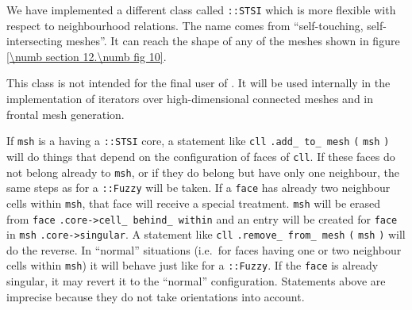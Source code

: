 We have implemented a different class called {\small\tt{}::STSI} which is more
flexible with respect to neighbourhood relations.
The name comes from ``self-touching, self-intersecting meshes''.
It can reach the shape of any of the meshes shown in figure \ref{\numb section 12.\numb fig 10}.

This class is not intended for the final user of \maniFEM.
It will be used internally in the implementation of iterators over high-dimensional connected meshes
and in frontal mesh generation.

If {\small\tt msh} is a {\small\tt{}} having a {\small\tt{}::STSI} core,
a statement like
{\small\tt cll} {\small\tt .add\_\,to\_\,mesh} {\small\tt (} {\small\tt msh} {\small\tt )}
will do things that depend on the configuration of faces of {\small\tt cll}.
If these faces do not belong already to {\small\tt msh}, or if they do belong but have only one
neighbour, the same steps as for a {\small\tt{}::Fuzzy} will be taken.%
If a {\small\tt face} has already two neighbour cells within {\small\tt msh}, that face will receive
a special treatment.
{\small\tt msh} will be erased from {\small\tt face} {\small\tt .core->cell\_\,behind\_\,within}
and an entry will be created for {\small\tt face} in {\small\tt msh} {\small\tt .core->singular}.
A statement like {\small\tt cll} {\small\tt .remove\_\,from\_\,mesh} {\small\tt (} {\small\tt msh}
{\small\tt )} will do the reverse.
In ``normal'' situations (i.e.\ for faces having one or two neighbour cells within {\small\tt msh})
it will behave just like for a {\small\tt{}::Fuzzy}.
If the {\small\tt face} is already singular, it may revert it to the ``normal'' configuration.
Statements above are imprecise because they do not take orientations into account.

